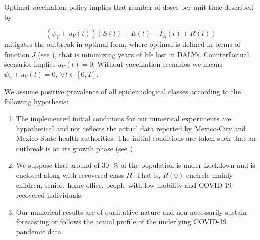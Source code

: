 %
    \begin{rmk}
        Optimal vaccination policy implies that number of doses per unit time
        described by

        $$
            (\psi_{V}+u_V(t))(S(t)+E(t)+I_A(t)+R(t))
        $$
        mitigates the outbreak in optimal form, where optimal is defined in
        terms of function $J$ (see ), that is
        minimizing years of life lost in DALYs.
        Counterfactual scenarios implies $u_V(t)=0$. Without vaccination
        scenarios we means $\psi_{V} + u_V(t)=0,  \ \forall t \in [0, T]$.
    \end{rmk}
%
    \begin{rmk}
        We assume positive prevalence of all epidemiological
        classes according to the following hypothesis:
        \begin{enumerate}[{(IC)}-1]
            \item
                The implemented initial conditions for our
                numerical experiments are
                hypothetical and not reflects the
                actual data reported by Mexico-City and Mexico-State
                health authorities. The initial conditions are taken such
                that an outbreak is on its growth phase
                (see ).
            \item
                We suppose that around of \SI{30}{\percent}
                of the population is under Lockdown and is
                enclosed along with recovered class $R$. That
                is, $R(0)$ encircle mainly  children, senior,
                home office, people with low mobility and
                COVID-19 recovered individuals.
            \item
                Our numerical results are of
                qualitative nature and non necessarily sustain
                forecasting or follows the actual profile of the
                underlying COVID-19 pandemic data.
        \end{enumerate}
    \end{rmk}

